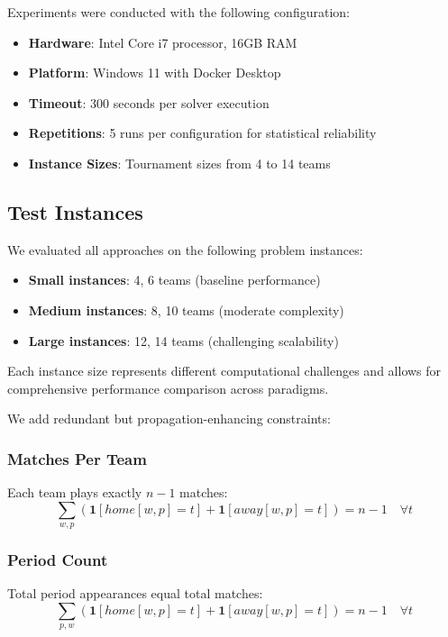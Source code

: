 \documentclass[11pt]{article}
\begin{document}
Experiments were conducted with the following configuration:
\begin{itemize}
    \item \textbf{Hardware}: Intel Core i7 processor, 16GB RAM
    \item \textbf{Platform}: Windows 11 with Docker Desktop
    \item \textbf{Timeout}: 300 seconds per solver execution
    \item \textbf{Repetitions}: 5 runs per configuration for statistical reliability
    \item \textbf{Instance Sizes}: Tournament sizes from 4 to 14 teams
\end{itemize}

\subsection{Test Instances}

We evaluated all approaches on the following problem instances:
\begin{itemize}
    \item \textbf{Small instances}: 4, 6 teams (baseline performance)
    \item \textbf{Medium instances}: 8, 10 teams (moderate complexity)
    \item \textbf{Large instances}: 12, 14 teams (challenging scalability)
\end{itemize}

Each instance size represents different computational challenges and allows for comprehensive performance comparison across paradigms.

We add redundant but propagation-enhancing constraints:

\subsubsection{Matches Per Team}
Each team plays exactly $n-1$ matches:
\begin{equation}
\sum_{w,p} (\mathbf{1}[home[w,p] = t] + \mathbf{1}[away[w,p] = t]) = n-1 \quad \forall t
\end{equation}

\subsubsection{Period Count}
Total period appearances equal total matches:
\begin{equation}
\sum_{p,w} (\mathbf{1}[home[w,p] = t] + \mathbf{1}[away[w,p] = t]) = n-1 \quad \forall t
\end{equation}
\end{document}
